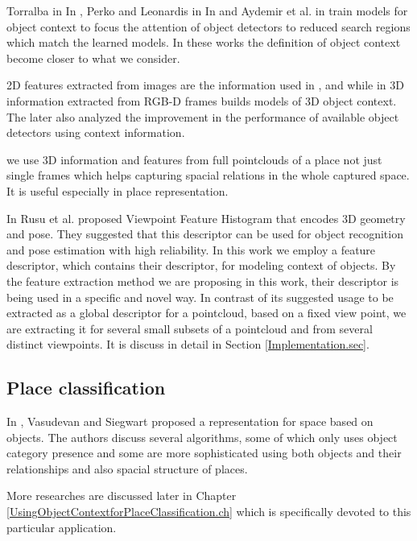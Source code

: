      Torralba in In \cite{TorralbaContextualPriming}, Perko and Leonardis in In \cite{PerkoLeonardisContextDriven}
     and Aydemir et al. in  \cite{aydemir2012_3Dcontext} train models for object context to focus
     the attention of object detectors to reduced search regions which match the learned models.
     In these works the definition of object context become closer to what we consider.
     
2D features extracted from images are the information used in \cite{TrollbaContexBased}, 
\cite{TorralbaContextualPriming} and \cite{PerkoLeonardisContextDriven} while in \cite{aydemir2012_3Dcontext}
3D information extracted from RGB-D frames builds models of 3D object context.
The later also analyzed the improvement in the performance of available object detectors using context information.
      
      we use 3D information and features from full pointclouds of a place not just single frames 
      which helps capturing spacial relations in the whole captured space.
      It is useful especially in place representation.
      
    In \cite{5651280} Rusu et al. proposed Viewpoint Feature Histogram that encodes 3D geometry and pose. 
    They suggested that this descriptor can be used for object recognition and pose estimation with high reliability.
    In this work we employ a feature descriptor, which contains their descriptor, for modeling context of objects.
    By the feature extraction method we are proposing in this work, their descriptor is being used in a specific and 
    novel way.
    In contrast of its suggested usage to be extracted as a global descriptor for a pointcloud, based on a fixed view point,
    we are extracting it for several small subsets of a pointcloud and from several distinct viewpoints.
    It is discuss in detail in Section \ref{Implementation.sec}.
     
\subsection*{Place classification}

    In \cite{Vasudevan2008522}, Vasudevan and Siegwart proposed a representation for space based on objects. 
    The authors discuss several algorithms, some of which only uses object category presence and some are more 
    sophisticated using both objects and their relationships and also spacial structure of places.
    
    More researches are discussed later in Chapter \ref{UsingObjectContextforPlaceClassification.ch} which is 
    specifically devoted to this particular application.
     
